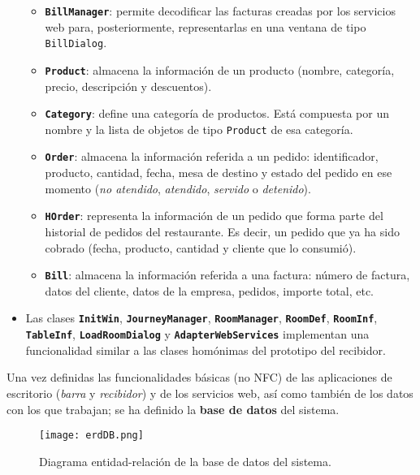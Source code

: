 \begin{itemize}
\begin{itemize}
  \item \textbf{\texttt{BillManager}}: permite decodificar las facturas creadas 
  por los servicios web para, posteriormente, representarlas en una ventana de 
  tipo \texttt{BillDialog}.
  \item \textbf{\texttt{Product}}: almacena la información de un producto 
  (nombre, categoría, precio, descripción y descuentos).
  \item \textbf{\texttt{Category}}: define una categoría de productos. Está 
  compuesta por un nombre y la lista de objetos de tipo \texttt{Product} de esa
  categoría.
  \item \textbf{\texttt{Order}}: almacena la información referida a un pedido:
  identificador, producto, cantidad, fecha, mesa de destino y estado del
  pedido en ese momento (\emph{no atendido}, \emph{atendido}, \emph{servido}
  o \emph{detenido}).
  \item \textbf{\texttt{HOrder}}: representa la información de un pedido que 
  forma parte del historial de pedidos del restaurante. Es decir, un pedido que 
  ya ha sido cobrado (fecha, producto, cantidad y cliente que lo consumió).
  \item \textbf{\texttt{Bill}}: almacena la información referida a una factura:
  número de factura, datos del cliente, datos de la empresa, pedidos, importe
  total, etc.
  \end{itemize}
\item Las clases \textbf{\texttt{InitWin}}, \textbf{\texttt{JourneyManager}},
\textbf{\texttt{RoomManager}}, \textbf{\texttt{RoomDef}},
\textbf{\texttt{RoomInf}}, \textbf{\texttt{TableInf}},
\textbf{\texttt{LoadRoomDialog}} y \textbf{\texttt{AdapterWebServices}} 
implementan una funcionalidad similar a las clases homónimas del prototipo del 
recibidor.
\end{itemize}

Una vez definidas las funcionalidades básicas (no \acs{NFC}) de las
aplicaciones de escritorio (\emph{barra} y \emph{recibidor}) y de los servicios 
web, así como también de los datos con los que trabajan; se ha definido la 
\textbf{base de datos} del sistema.

  \begin{figure}[h]
    \begin{center}
      \texttt{[image: erdDB.png]}
      \caption{Diagrama entidad-relación de la base de datos del sistema.}
      \label{fig:erdDB}
    \end{center}
  \end{figure}

